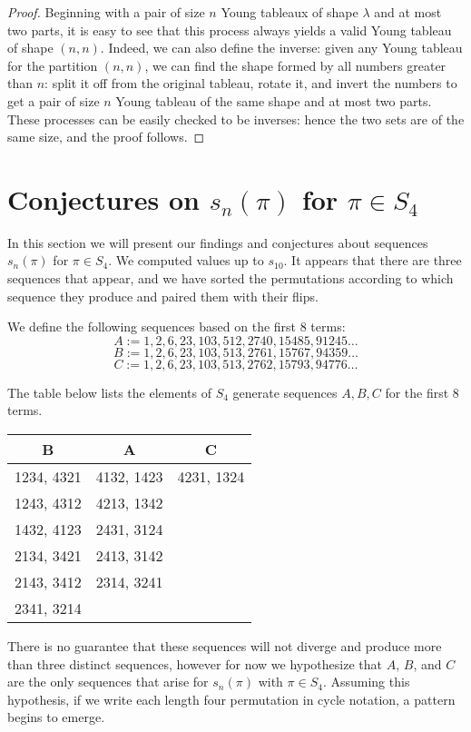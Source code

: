 \documentclass[11pt,letterpaper,twoside,english]{article}
\theoremstyle{theorem}
\theoremstyle{remark}
\begin{document}
\begin{proof}
Beginning with a pair of size $n$ Young tableaux of shape $\lambda$ and at most two parts, it is easy to see that this process always yields a valid Young tableau of shape $(n, n)$. Indeed, we can also define the inverse: given any Young tableau for the partition $(n, n)$, we can find the shape formed by all numbers greater than $n$: split it off from the original tableau, rotate it, and invert the numbers to get a pair of size $n$ Young tableau of the same shape and at most two parts. These processes can be easily checked to be inverses: hence the two sets are of the same size, and the proof follows.
\end{proof}

\section{Conjectures on $s_n(\pi)$ for $\pi\in S_4$}
\label{S4}

In this section we will present our findings and conjectures about sequences $s_n(\pi)$ for $\pi\in S_4$. We computed values up to $s_{10}$. It appears that there are three sequences that appear, and we have sorted the permutations according to which sequence they produce and paired them with their flips.  

We define the following sequences based on the first 8 terms:
$$
A:=1,2,6,23,103,512,2740,15485,91245\ldots
$$
$$
B:=1,2,6,23,103,513,2761,15767,94359\ldots
$$
$$
C:=1,2,6,23,103,513,2762,15793,94776\ldots
$$

The table below lists the elements of $S_4$ generate sequences $A,B,C$ for the first 8 terms.

\begin{center}
\begin{tabular}{|c|c|c|}
B &A&C\\
\hline
1234, 4321&4132, 1423&4231, 1324\\
1243, 4312&4213, 1342&\\
1432, 4123&2431, 3124&\\
2134, 3421&2413, 3142&\\
2143, 3412&2314, 3241&\\
2341, 3214&&\\
\end{tabular}
\end{center}

There is no guarantee that these sequences will not diverge and produce more than three distinct sequences, however for now we hypothesize that $A$, $B$, and $C$ are the only sequences that arise for $s_n(\pi)$ with $\pi\in S_4$. Assuming this hypothesis, if we write each length four permutation in cycle notation, a pattern begins to emerge. 
\end{document}
